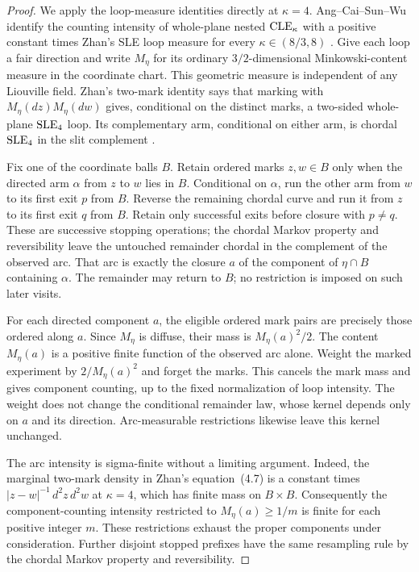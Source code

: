 \begin{proof}
We apply the loop-measure identities directly at $\kappa=4$.
Ang--Cai--Sun--Wu identify the counting intensity of whole-plane nested
$\mathrm{CLE}_\kappa$ with a positive constant times Zhan's SLE loop measure for
every $\kappa\in(8/3,8)$ \cite[Theorem~1.1]{ACSWloops}.
Give each loop a fair direction and write $M_\eta$ for its ordinary
$3/2$-dimensional Minkowski-content measure in the coordinate chart.
This geometric measure is independent of any Liouville field.
Zhan's two-mark identity \cite[Theorem~4.2(i), equation~(4.7)]{ZhanLoops}
says that marking with $M_\eta(dz)M_\eta(dw)$ gives, conditional on the
distinct marks, a two-sided whole-plane $\mathrm{SLE}_4$ loop.
Its complementary arm, conditional on either arm, is chordal $\mathrm{SLE}_4$ in
the slit complement \cite[Section~2.2]{ZhanLoops}.

Fix one of the coordinate balls $B$.
Retain ordered marks $z,w\in B$ only when the directed arm $\alpha$ from
$z$ to $w$ lies in $B$.
Conditional on $\alpha$, run the other arm from $w$ to its first exit
$p$ from $B$.  Reverse the remaining chordal curve and run it from $z$
to its first exit $q$ from $B$.  Retain only successful exits before
closure with $p\ne q$.
These are successive stopping operations; the chordal Markov property and
reversibility leave the untouched remainder chordal in the complement of
the observed arc.  That arc is exactly the closure $a$ of the component of
$\eta\cap B$ containing $\alpha$.  The remainder may return to $B$;
no restriction is imposed on such later visits.

For each directed component $a$, the eligible ordered mark pairs are
precisely those ordered along $a$.  Since $M_\eta$ is diffuse, their mass
is $M_\eta(a)^2/2$.
The content $M_\eta(a)$ is a positive finite function of the observed arc
alone.  Weight the marked experiment by $2/M_\eta(a)^2$ and forget the
marks.  This cancels the mark mass and gives component counting, up to the
fixed normalization of loop intensity.  The weight does not change the
conditional remainder law, whose kernel depends only on $a$ and its
direction.  Arc-measurable restrictions likewise leave this kernel
unchanged.

The arc intensity is sigma-finite without a limiting argument.
Indeed, the marginal two-mark density in Zhan's equation~(4.7) is a
constant times $|z-w|^{-1}\,d^2z\,d^2w$ at $\kappa=4$, which has finite
mass on $B\times B$.
Consequently the component-counting intensity restricted to
$M_\eta(a)\ge 1/m$ is finite for each positive integer $m$.
These restrictions exhaust the proper components under consideration.
Further disjoint stopped prefixes have the same resampling rule by the
chordal Markov property and reversibility.


\end{proof}
